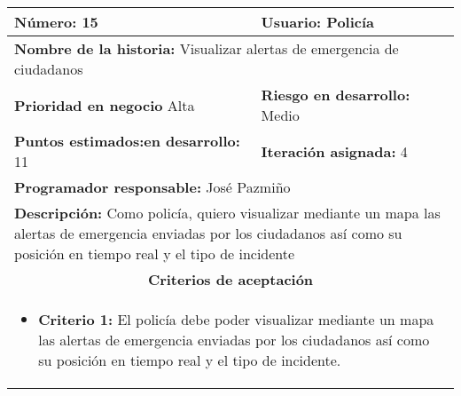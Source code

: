 \begin{longtable}{|p{6.7cm}|p{6.7cm}|}
    \textbf{Número:} 15                                  & \textbf{Usuario:} Policía                                                                                                                                      \\
    \hline
    \multicolumn{2}{|l|}{\textbf{Nombre de la historia:} Visualizar alertas de emergencia de ciudadanos}                                                                                                                  \\
    \hline
    \textbf{Prioridad en negocio}  Alta                  & \textbf{Riesgo en desarrollo:} Medio                                                                                                                           \\
    \hline
    \textbf{\textbf{Puntos estimados:}en desarrollo:} 11 & \textbf{Iteración asignada:} 4                                                                                                                                 \\
    \hline
    \multicolumn{2}{|l|}{\textbf{Programador responsable:} José Pazmiño }                                                                                                                                                 \\
    \hline
    \multicolumn{2}{|p{13.4cm}|}{\textbf{Descripción:} Como policía, quiero visualizar mediante un mapa las alertas de emergencia enviadas por los ciudadanos así como su posición en tiempo real y el tipo de incidente} \\
    \hline
    \multicolumn{2}{|c|}{\textbf{Criterios de aceptación}}                                                                                                                                                                \\
    \hline
    \multicolumn{2}{|p{13.4cm}|}{
    \begin{itemize}[label={},leftmargin=*, nosep]
        \item \textbf{Criterio 1:} El policía debe poder visualizar mediante un mapa las alertas de emergencia enviadas por los ciudadanos así como su posición en tiempo real y el tipo de incidente.
    \end{itemize}
    }
    \\
\end{longtable}



